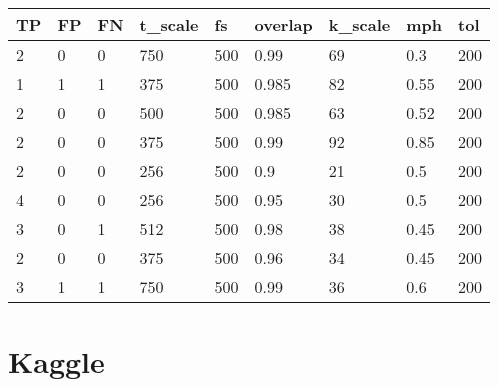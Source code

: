 \begin{table}[!ht]
    \centering
    \begin{tabular}{|l|l|l|l|l|l|l|l|l|}
    \hline
        TP & FP & FN & t\_scale & fs & overlap & k\_scale & mph & tol \\ \hline
        2 & 0 & 0 & 750 & 500 & 0.99 & 69 & 0.3 & 200 \\ \hline
        1 & 1 & 1 & 375 & 500 & 0.985 & 82 & 0.55 & 200 \\ \hline
        2 & 0 & 0 & 500 & 500 & 0.985 & 63 & 0.52 & 200 \\ \hline
        2 & 0 & 0 & 375 & 500 & 0.99 & 92 & 0.85 & 200 \\ \hline
        2 & 0 & 0 & 256 & 500 & 0.9 & 21 & 0.5 & 200 \\ \hline
        4 & 0 & 0 & 256 & 500 & 0.95 & 30 & 0.5 & 200 \\ \hline
        3 & 0 & 1 & 512 & 500 & 0.98 & 38 & 0.45 & 200 \\ \hline
        2 & 0 & 0 & 375 & 500 & 0.96 & 34 & 0.45 & 200 \\ \hline
        3 & 1 & 1 & 750 & 500 & 0.99 & 36 & 0.6 & 200 \\ \hline
    \end{tabular}
\end{table}

\section{Kaggle}

